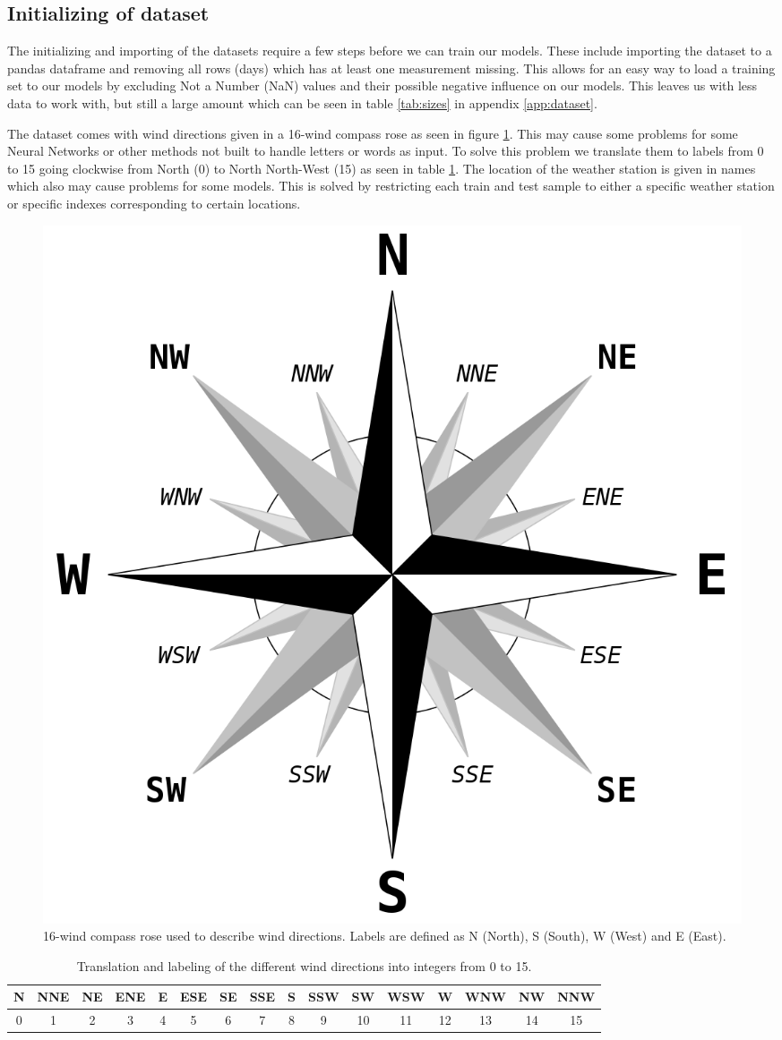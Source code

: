 \documentclass[11pt]{article}
\begin{document}
\subsection{Initializing of dataset}
The initializing and importing of the datasets require a few steps before we can train our models. These include importing the dataset to a pandas dataframe and removing all rows (days) which has at least one measurement missing. This allows for an easy way to load a training set to our models by excluding Not a Number (NaN) values and their possible negative influence on our models. This leaves us with less data to work with, but still a large amount which can be seen in table \ref{tab:sizes} in appendix \ref{app:dataset}.

The dataset comes with wind directions given in a 16-wind compass rose as seen in figure \ref{fig:compass}. This may cause some problems for some Neural Networks or other methods not built to handle letters or words as input. To solve this problem we translate them to labels from 0 to 15 going clockwise from North (0) to North North-West (15) as seen in table \ref{tab:compass}. The location of the weather station is given in names which also may cause problems for some models. This is solved by restricting each train and test sample to either a specific weather station or specific indexes corresponding to certain locations.
\begin{figure}[H]
    \centering
    \includegraphics[width=.3\textwidth]{../figures/Brosen_windrose.png}
    \caption{16-wind compass rose used to describe wind directions. Labels are defined as N (North), S (South), W (West) and E (East).}
    \label{fig:compass}
\end{figure}
\begin{table}[H]
    \begin{small}
        \caption{Translation and labeling of the different wind directions into integers from 0 to 15.}
        \label{tab:compass}
        \begin{center}
            \begin{tabular}{|c|c|c|c|c|c|c|c|c|c|c|c|c|c|c|c|}
                \hline
                N & NNE & NE & ENE & E & ESE & SE & SSE & S & SSW & SW & WSW & W  & WNW & NW & NNW \\
                \hline
                0 & 1   & 2  & 3   & 4 & 5   & 6  & 7   & 8 & 9   & 10 & 11  & 12 & 13  & 14 & 15  \\
                \hline
            \end{tabular}
        \end{center}
    \end{small}
\end{table}
\end{document}
